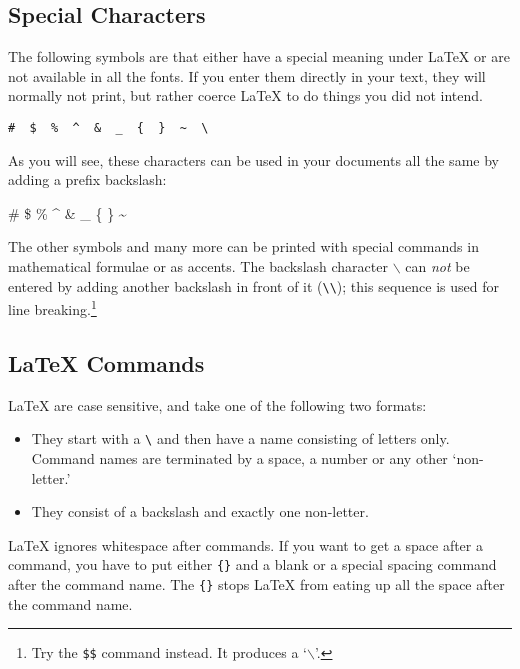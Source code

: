 \subsection{Special Characters}

The following symbols are  that either have a
special meaning under \LaTeX{} or are not available in all the fonts.
If you enter them directly in your text, they will normally not print,
but rather coerce \LaTeX{} to do things you did not intend. 
\begin{code}
\verb.#  $  %  ^  &  _  {  }  ~  \ . %
\end{code}

As you will see, these characters can be used in your documents all
the same by adding a prefix backslash:

\begin{example}
\# \$ \% \^{} \& \_ \{ \} \~{} 
\end{example}

The other symbols and many more can be printed with special commands
in mathematical formulae or as accents. The backslash character
$\backslash$ can \emph{not} be entered by adding another backslash
in front of it (\verb|\\|); this sequence is used for
line breaking.\footnote{Try the \texttt{\$}\texttt{\$} command instead. It
  produces a `$\backslash$'.}

\subsection{\LaTeX{} Commands}

\LaTeX{}  are case sensitive, and take one of the following
two formats:

\begin{itemize}
\item They start with a  \verb|\| and then have a name
 consisting of letters only. Command names are terminated by a
 space, a number or any other `non-letter.'
\item They consist of a backslash and exactly one non-letter.
\end{itemize}

%
%

%
%
\label{whitespace}

\LaTeX{} ignores whitespace after commands. If you want to get a
space after a command, you have to
put either \verb|{}| and a blank or a special spacing command after the
command name. The \verb|{}| stops \LaTeX{} from eating up all the space after
the command name. 

